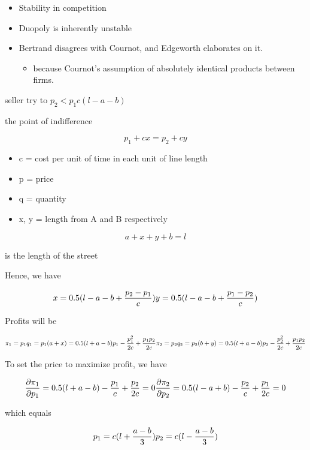 \documentclass[
]{book}
\providecommand{\tightlist}{%
  \setlength{\itemsep}{0pt}\setlength{\parskip}{0pt}}
\begin{document}
\begin{itemize}
\item
  Stability in competition
\item
  Duopoly is inherently unstable
\item
  Bertrand disagrees with Cournot, and Edgeworth elaborates on it.

  \begin{itemize}
  \tightlist
  \item
    because Cournot's assumption of absolutely identical products between firms.
  \end{itemize}
\end{itemize}

seller try to \(p_2 < p_1 c(l-a-b)\)

the point of indifference

\[
p_1 + cx = p_2 + cy
\]

\begin{itemize}
\item
  c = cost per unit of time in each unit of line length
\item
  p = price
\item
  q = quantity
\item
  x, y = length from A and B respectively
\end{itemize}

\[
a + x + y + b = l
\]

is the length of the street

Hence, we have

\[
x = 0.5(l - a - b + \frac{p_2- p_1}{c}) \\
y = 0.5(l - a - b + \frac{p_1- p_2}{c})
\]

Profits will be

\[
\pi_1 = p_1 q_1 = p_1 (a+ x) = 0.5 (l + a - b) p_1 - \frac{p_1^2}{2c} + \frac{p_1 p_2}{2c} \\
\pi_2 = p_2 q_2 = p_2 (b+ y) = 0.5 (l + a - b) p_2 - \frac{p_2^2}{2c} + \frac{p_1 p_2}{2c}
\]

To set the price to maximize profit, we have

\[
\frac{\partial \pi_1}{\partial p_1} = 0.5 (l + a - b) - \frac{p_1}{c} + \frac{p_2}{2c} = 0 \\
\frac{\partial \pi_2}{\partial p_2} = 0.5 (l - a + b) - \frac{p_2}{c} + \frac{p_1}{2c} = 0
\]

which equals

\[
p_1 = c(l + \frac{a-b}{3}) \\
p_2 = c(l - \frac{a-b}{3})
\]
\end{document}
